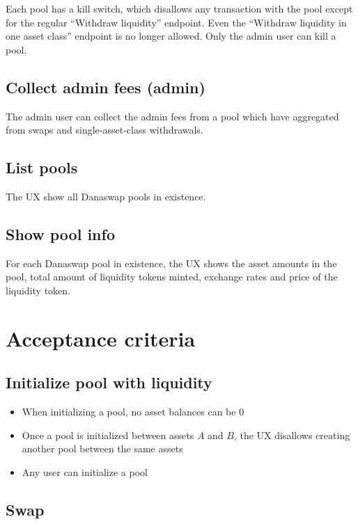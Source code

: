 \documentclass{article}
\begin{document}
Each pool has a kill switch, which disallows any transaction with the pool
except for the regular ``Withdraw liquidity'' endpoint. Even the ``Withdraw
liquidity in one asset class'' endpoint is no longer allowed. Only the admin
user can kill a pool.

\subsection*{Collect admin fees (admin)}

The admin user can collect the admin fees from a pool which have aggregated from
swaps and single-asset-class withdrawals.

\subsection*{List pools}

The UX show all Danaswap pools in existence.

\subsection*{Show pool info}

For each Danaswap pool in existence, the UX shows the asset amounts in the pool,
total amount of liquidity tokens minted, exchange rates and price of the
liquidity token.

\section{Acceptance criteria}

\subsection*{Initialize pool with liquidity}

\begin{itemize}
  \item When initializing a pool, no asset balances can be $0$
  \item Once a pool is initialized between assets $A$ and $B$, the UX disallows
    creating another pool between the same assets
  \item Any user can initialize a pool
\end{itemize}

\subsection*{Swap}
\end{document}
